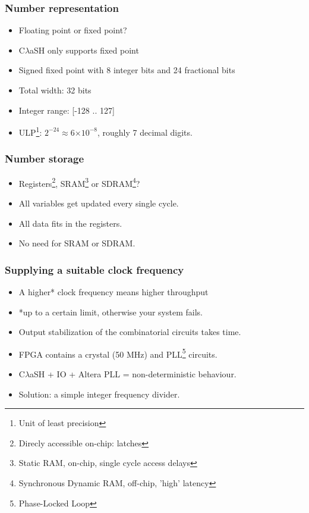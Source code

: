 \documentclass{beamer}[10]
\newcommand{\clash}{C$\lambda$aSH}
\providecommand{\e}[1]{\ensuremath{\times 10^{#1}}}
\begin{document}
\begin{frame}
	\frametitle{Number representation}
	
	\begin{itemize}
		\item Floating point or fixed point?
		
		\pause
		\vspace{15pt}
		\item \clash{} only supports fixed point
		
		\pause
		\vspace{15pt}
		\item Signed fixed point with 8 integer bits and 24 fractional bits
		\item Total width: 32 bits
		\item Integer range: [-128 .. 127]
		\item ULP\footnote{Unit of least precision}: $2^{-24} \approx 6\e{-8}$, roughly 7 decimal digits.
	\end{itemize}
	
\end{frame}

\begin{frame}
	\frametitle{Number storage}
	
	\begin{itemize}
		\item Registers\footnote{Direcly accessible on-chip: latches}, SRAM\footnote{Static RAM, on-chip, single cycle access delays} or SDRAM\footnote{Synchronous Dynamic RAM, off-chip, 'high' latency}?
		\pause
		\vspace{15pt}
		\item All variables get updated every single cycle.
		\item All data fits in the registers.
		\item No need for SRAM or SDRAM.
	\end{itemize}
	
\end{frame}

\begin{frame}
	\frametitle{Supplying a suitable clock frequency}
	
	\begin{itemize}
		\item A higher* clock frequency means higher throughput 
		\pause
		\vspace{15pt}
		\item *up to a certain limit, otherwise your system fails.
		\item Output stabilization of the combinatorial circuits takes time.
		\pause
		\vspace{15pt}
		\item FPGA contains a crystal (50 MHz) and PLL\footnote{Phase-Locked Loop} circuits.
		\item \clash{} + IO + Altera PLL = non-deterministic behaviour.
		\item Solution: a simple integer frequency divider.
	\end{itemize}
\end{frame}
\end{document}

